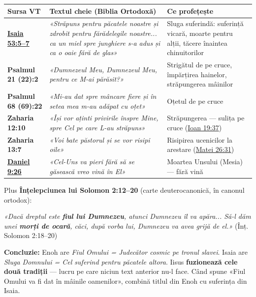 \documentclass[12pt,a4paper,twoside,openany]{book}
\begin{document}
\begin{center}
\small
\begin{tabular}{L{1.1cm}L{8.5cm}L{5.3cm}}
\toprule
{}
\textbf{Sursa VT} & \textbf{Textul cheie (Biblia Ortodoxă)} & \textbf{Ce profețește} \\
\midrule
\textbf{\href{https://bibliaortodoxa.ro/carte.php?id=43\&cap=53\#5}{Isaia 53:5–7}} & \textit{«Străpuns pentru păcatele noastre și zdrobit pentru fărădelegile noastre... ca un miel spre junghiere s-a adus și ca o oaie fără de glas»} & Sluga suferindă: suferință vicară, moarte pentru alții, tăcere înaintea chinuitorilor \\
\textbf{Psalmul 21 (22):2} & \textit{«Dumnezeul Meu, Dumnezeul Meu, pentru ce M-ai părăsit?»} & Strigătul de pe cruce, împărțirea hainelor, străpungerea mâinilor \\
\textbf{Psalmul 68 (69):22} & \textit{«Mi-au dat spre mâncare fiere și în setea mea m-au adăpat cu oțet»} & Oțetul de pe cruce \\
\textbf{Zaharia 12:10} & \textit{«Își vor aținti privirile înspre Mine, spre Cel pe care L-au străpuns»} & Străpungerea — sulița pe cruce (\href{https://bibliaortodoxa.ro/carte.php?id=35\&cap=19\#37}{Ioan 19:37}) \\
\textbf{Zaharia 13:7} & \textit{«Voi bate păstorul și se vor risipi oile»} & Risipirea ucenicilor la arestare (\href{https://bibliaortodoxa.ro/carte.php?id=55\&cap=26\#31}{Matei 26:31}) \\
\textbf{\href{https://bibliaortodoxa.ro/carte.php?id=16\&cap=9\#26}{Daniel 9:26}} & \textit{«Cel-Uns va pieri fără să se găsească vreo vină în El»} & Moartea Unsului (Mesia) — fără vină \\
\bottomrule
\end{tabular}
\end{center}
\normalsize
Plus \textbf{Înțelepciunea lui Solomon 2:12–20} (carte deuterocanonică, în canonul ortodox):


\begin{biblequote}
\textit{«Dacă dreptul este \textbf{fiul lui Dumnezeu}, atunci Dumnezeu îl va apăra... Să-l dăm unei \textbf{morți de ocară}, căci, după vorba lui, Dumnezeu va avea grijă de el.»} (Înț. Solomon 2:18–20)
\end{biblequote}
\textbf{Concluzie:} Enoh are \textit{Fiul Omului = Judecător cosmic pe tronul slavei}. Isaia are \textit{Sluga Domnului = Cel suferind pentru păcatele altora}. Iisus \textbf{fuzionează cele două tradiții} — lucru pe care niciun text anterior nu-l face. Când spune «Fiul Omului va fi dat în mâinile oamenilor», combină titlul din Enoh cu suferința din Isaia.
\end{document}
